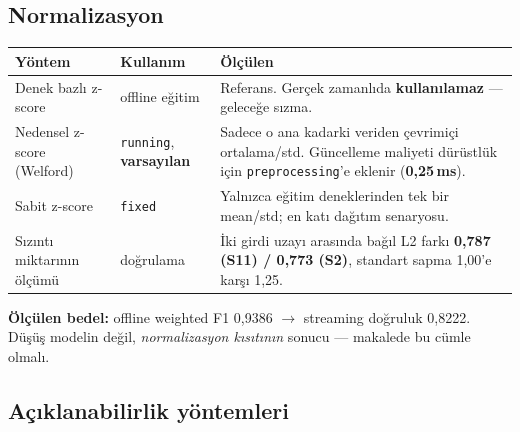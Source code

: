 \documentclass[11pt,a4paper]{article}
\newcommand{\ms}{\,ms}
\newcommand{\kod}[1]{\texttt{\small #1}}
\begin{document}
\subsection{Normalizasyon}

\begin{longtable}{@{}p{4.0cm}p{2.9cm}p{8.6cm}@{}}
\toprule
\textbf{Yöntem} & \textbf{Kullanım} & \textbf{Ölçülen} \\
\midrule
\endhead
Denek bazlı z-score & offline eğitim &
Referans. Gerçek zamanlıda \textbf{kullanılamaz} --- geleceğe sızma. \\
\addlinespace
Nedensel z-score (Welford) & \kod{running}, \textbf{varsayılan} &
Sadece o ana kadarki veriden çevrimiçi ortalama/std. Güncelleme maliyeti
dürüstlük için \kod{preprocessing}'e eklenir (\textbf{0{,}25\ms}). \\
\addlinespace
Sabit z-score & \kod{fixed} &
Yalnızca eğitim deneklerinden tek bir mean/std; en katı dağıtım senaryosu. \\
\addlinespace
Sızıntı miktarının ölçümü & doğrulama &
İki girdi uzayı arasında bağıl L2 farkı \textbf{0{,}787 (S11) / 0{,}773 (S2)},
standart sapma 1{,}00'e karşı 1{,}25. \\
\bottomrule
\end{longtable}

\textbf{Ölçülen bedel:} offline weighted F1 0{,}9386 $\rightarrow$ streaming
doğruluk 0{,}8222. Düşüş modelin değil, \emph{normalizasyon kısıtının} sonucu
--- makalede bu cümle olmalı.

\subsection{Açıklanabilirlik yöntemleri}
\end{document}
